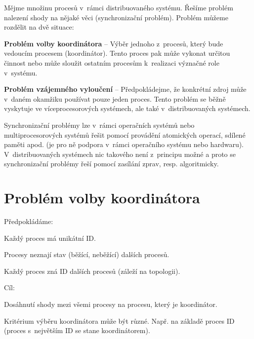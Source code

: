 \begin{compactitem}
    \item Mějme množinu procesů v~rámci distribuovaného systému. Řešíme problém  nalezení shody na nějaké věci (synchronizační problém). Problém můžeme rozdělit na dvě situace:
    \begin{compactitem}
        \item \textbf{Problém volby koordinátora} -- Výběr jednoho z~procesů, který bude vedoucím procesem (koordinátor). Tento proces pak může vykonat určitou činnost nebo může sloužit ostatním procesům k~realizaci  význačné role v~systému.
        \item \textbf{Problém vzájemného vyloučení} -- Předpokládejme, že konkrétní zdroj může v~daném okamžiku používat pouze jeden proces. Tento problém se běžně vyskytuje ve víceprocesorových systémech, ale také v~distribuovaných systémech.
    \end{compactitem}
    \item Synchronizační problémy lze v~rámci operačních systémů nebo multiprocesorových systémů řešit pomocí provádění atomických operací, sdílené paměti apod. (je pro ně podpora v~rámci operačního systému nebo hardwaru). V~distribuovaných systémech nic takového není z~principu možné a proto se synchronizační problémy řeší pomocí zasílání zprav, resp. algoritmicky.
\end{compactitem}


\section{Problém volby koordinátora}

\begin{compactitem}
    \item Předpokládáme:
    \begin{compactitem}
        \item Každý proces má unikátní ID.
        \item Procesy neznají stav (běžící, neběžící) dalších procesů.
        \item Každý proces zná ID dalších procesů (záleží na topologii).
    \end{compactitem}
    \item Cíl:
    \begin{compactitem}
        \item Dosáhnutí shody mezi všemi procesy na procesu, který je koordinátor.
        \item Kritérium výběru koordinátora může být různé. Např. na základě proces ID (proces s~největším ID se stane koordinátorem).
    \end{compactitem}
\end{compactitem}

